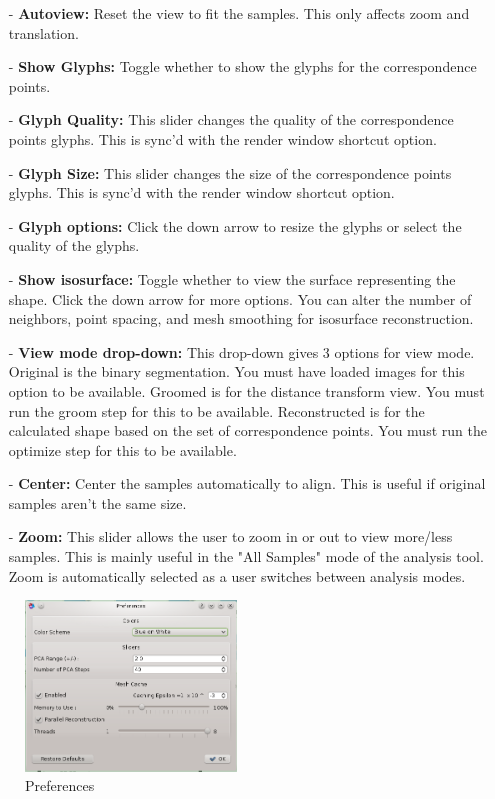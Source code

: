 \documentclass[letterpaper,12pt]{article}   %
\begin{document}
\begin{itemize}

\item[-] \textbf{Autoview:} Reset the view to fit the samples. This only affects zoom and translation.

\item[-] \textbf{Show Glyphs:} Toggle whether to show the glyphs for the correspondence points.

\item[-] \textbf{Glyph Quality:} This slider changes the quality of the correspondence points glyphs. This is sync'd with the render window shortcut option.

\item[-] \textbf{Glyph Size:} This slider changes the size of the correspondence points glyphs. This is sync'd with the render window shortcut option.

\item[-] \textbf{Glyph options:} Click the down arrow to resize the glyphs or select the quality of the glyphs.

\item[-] \textbf{Show isosurface:} Toggle whether to view the surface representing the shape. Click the down arrow for more options. You can alter the number of neighbors, point spacing, and mesh smoothing for isosurface reconstruction.

\item[-] \textbf{View mode drop-down:} This drop-down gives 3 options for view mode. Original is the binary segmentation. You must have loaded images for this option to be available. Groomed is for the distance transform view. You must
run the groom step for this to be available. Reconstructed is for the calculated shape based on the set of correspondence points. You must run the optimize step for this to be available.

\item[-] \textbf{Center:} Center the samples automatically to align. This is useful if original samples aren't the same size.

\item[-] \textbf{Zoom:} This slider allows the user to zoom in or out to view more/less samples. This is mainly useful in the "All Samples" mode of the analysis tool. Zoom is automatically selected as a user switches between analysis modes.

\end{itemize}

\begin{figure}[!htp]
\centering
    \includegraphics[width=0.5\textwidth]{figs_v2/pref.png}
\caption{Preferences}
\label{fig:pref}
\end{figure}
\end{document}
